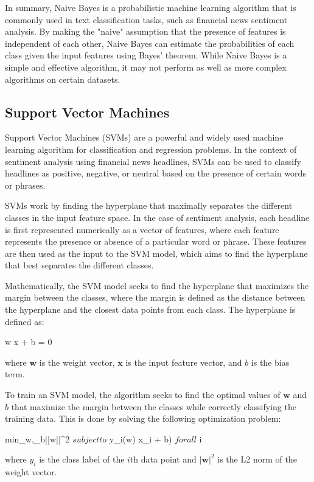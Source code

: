 \documentclass{article}
\begin{document}
In summary, Naive Bayes is a probabilistic machine learning algorithm that is commonly used in text classification tasks, such as financial news sentiment analysis. By making the "naive" assumption that the presence of features is independent of each other, Naive Bayes can estimate the probabilities of each class given the input features using Bayes' theorem. While Naive Bayes is a simple and effective algorithm, it may not perform as well as more complex algorithms on certain datasets.

\subsection{Support Vector Machines}

Support Vector Machines (SVMs) are a powerful and widely used machine learning algorithm for classification and regression problems. In the context of sentiment analysis using financial news headlines, SVMs can be used to classify headlines as positive, negative, or neutral based on the presence of certain words or phrases.

SVMs work by finding the hyperplane that maximally separates the different classes in the input feature space. In the case of sentiment analysis, each headline is first represented numerically as a vector of features, where each feature represents the presence or absence of a particular word or phrase. These features are then used as the input to the SVM model, which aims to find the hyperplane that best separates the different classes.

Mathematically, the SVM model seeks to find the hyperplane that maximizes the margin between the classes, where the margin is defined as the distance between the hyperplane and the closest data points from each class. The hyperplane is defined as:

w \cdot  x + b = 0

where $\mathbf{w}$ is the weight vector, $\mathbf{x}$ is the input feature vector, and $b$ is the bias term.

To train an SVM model, the algorithm seeks to find the optimal values of $\mathbf{w}$ and $b$ that maximize the margin between the classes while correctly classifying the training data. This is done by solving the following optimization problem:

min_w,_b||w||^2 $ subject to $ y_i(w) \dot x_i + b)  $ for all $ i

where $y_i$ is the class label of the $i$th data point and $|\mathbf{w}|^2$ is the L2 norm of the weight vector.
\end{document}
